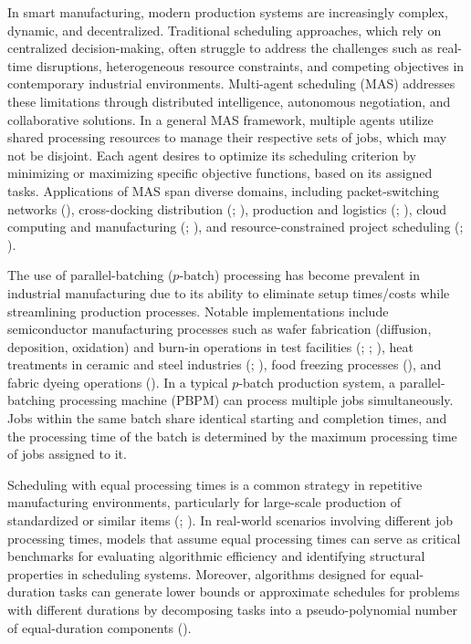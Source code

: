 \documentclass[12pt]{article}
\begin{document}
\begin{sloppypar}
In smart manufacturing, modern production systems are increasingly complex, dynamic, and decentralized. Traditional scheduling approaches, which rely on centralized decision-making, often struggle to address the challenges such as real-time disruptions, heterogeneous resource constraints, and competing objectives in contemporary industrial environments. Multi-agent scheduling (MAS) addresses these limitations through distributed intelligence, autonomous negotiation, and collaborative solutions. In a general MAS framework, multiple agents utilize shared processing resources to manage their respective sets of jobs, which may not be disjoint. Each agent desires to optimize its scheduling criterion by minimizing or maximizing specific objective functions, based on its assigned tasks. Applications of MAS span diverse domains, including packet-switching networks (\citealp{PerezGonzalez2014EJOR}), cross-docking distribution (\citealp{AgnetisBillaut2014Springer}; \citealp{Kovalyov2015JOS}), production and logistics (\citealp{NouiriBekrar2020IJPR}; \citealp{CaiLiLuoHe2023IJPR}), cloud computing and manufacturing (\citealp{WangYuYin2021IJPR}; \citealp{WangRenBai2024IJPR}), and resource-constrained project scheduling (\citealp{ServranckxCoelho2022IJPR}; \citealp{GengYuan2023EJOR}).

The use of parallel-batching ($p$-batch) processing has become prevalent in industrial manufacturing due to its ability to eliminate setup times/costs while streamlining production processes. Notable implementations include semiconductor manufacturing processes such as wafer fabrication (diffusion, deposition, oxidation) and burn-in operations in test facilities (\citealp{LeeUzsoy1992OR}; \citealp{RaniaMathirajan2023IJPR}; \citealp{KongWang2024IJPR}), heat treatments in ceramic and steel industries (\citealp{LiWangGupta2022CIE}; \citealp{FanGQWang2023IJPR}), food freezing processes (\citealp{KucukkocKK2024IJPR}), and fabric dyeing operations (\citealp{LeiDai2024IJPR}). In a typical $p$-batch production system, a parallel-batching processing machine (PBPM) can process multiple jobs simultaneously. Jobs within the same batch share identical starting and completion times, and the  processing time of the batch is determined by the maximum processing time of jobs assigned to it.

Scheduling with equal processing times is a common strategy in repetitive manufacturing environments, particularly for large-scale production of standardized or similar items (\citealp{KravchenkoWerner2011JOS}; \citealp{OronShabtaySteiner2015EJOR}). In real-world scenarios involving different job processing times, models that assume equal processing times can serve as critical benchmarks for evaluating algorithmic efficiency and identifying structural properties in scheduling systems. Moreover, algorithms designed for equal-duration tasks can generate lower bounds or approximate schedules for problems with different durations by decomposing tasks into a pseudo-polynomial number of equal-duration components (\citealp{DoverShabtay2016ANoR}). 


\end{sloppypar}
\end{document}
